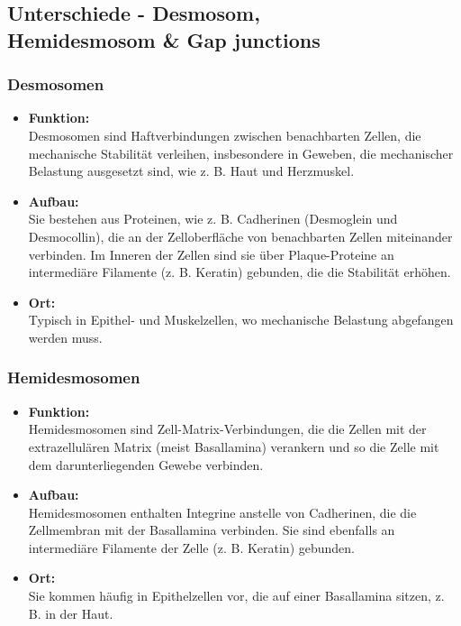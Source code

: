 \documentclass{article}
\begin{document}
\subsection{Unterschiede - Desmosom, \\ Hemidesmosom \& Gap junctions}
\subsubsection{Desmosomen}
\begin{itemize}
    \item \textbf{Funktion:} \\
    Desmosomen sind Haftverbindungen zwischen benachbarten Zellen, die mechanische Stabilität verleihen, insbesondere in Geweben, die mechanischer Belastung ausgesetzt sind, wie z. B. Haut und Herzmuskel.
    \item \textbf{Aufbau:} \\
    Sie bestehen aus Proteinen, wie z. B. Cadherinen (Desmoglein und Desmocollin), die an der Zelloberfläche von benachbarten Zellen miteinander verbinden. Im Inneren der Zellen sind sie über Plaque-Proteine an intermediäre Filamente (z. B. Keratin) gebunden, die die Stabilität erhöhen.
    \item \textbf{Ort:} \\
    Typisch in Epithel- und Muskelzellen, wo mechanische Belastung abgefangen werden muss.
\end{itemize}
\subsubsection{Hemidesmosomen}
\begin{itemize}
    \item \textbf{Funktion:}\\
        Hemidesmosomen sind Zell-Matrix-Verbindungen, die die Zellen mit der extrazellulären Matrix (meist Basallamina) verankern und so die Zelle mit dem darunterliegenden Gewebe verbinden.
    \item \textbf{Aufbau:}\\
        Hemidesmosomen enthalten Integrine anstelle von Cadherinen, die die Zellmembran mit der Basallamina verbinden. Sie sind ebenfalls an intermediäre Filamente der Zelle (z. B. Keratin) gebunden.
    \item \textbf{Ort:}\\
        Sie kommen häufig in Epithelzellen vor, die auf einer Basallamina sitzen, z. B. in der Haut.
        
\end{itemize}
\newpage
\end{document}
